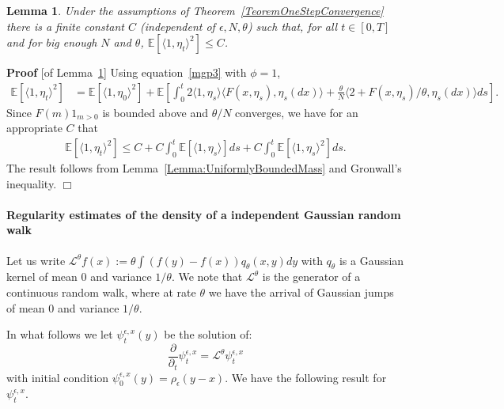 \documentclass[12pt]{article}
\newenvironment {proof}{{\noindent\bf Proof }}{\hfill $\Box$ \medskip}
\newtheorem{lemma}[theorem]{Lemma}
\newcommand{\IE}{\mathbb E}
\begin{document}
\begin{lemma}
        \label{lem:SecondMomentMass}
    Under the assumptions of Theorem~\ref{TeoremOneStepConvergence}
    there is a finite constant $C$ (independent of $\epsilon, N, \theta$) such that,
    for all $t \in [0,T]$ and for big enough $N$ and $\theta$,
    $\IE[ \langle 1, \eta_t \rangle^2] \leq C$.
\end{lemma} 

\begin{proof}[of Lemma~\ref{lem:SecondMomentMass}]
    Using equation~\eqref{mgp3} with $\phi = 1$,
    \begin{align*}
        \IE[\langle 1, \eta_t \rangle^2]
        &=
        \IE[\langle 1, \eta_0 \rangle^2]
        +
        \IE\left[
        \int_0^t
            2 \langle 1, \eta_s \rangle
            \langle F(x, \eta_s), \eta_s(dx) \rangle
            +
            \frac{\theta}{N} \langle 2 + F(x, \eta_s)/\theta, \eta_s(dx) \rangle
        ds
        \right] .
    \end{align*}
    Since $F(m)1_{m > 0}$ is bounded above and $\theta/N$ converges,
    we have for an appropriate $C$ that
    \begin{align*}
        \IE[\langle 1, \eta_t \rangle^2]
        \le
        C + C \int_0^t \IE[\langle 1, \eta_s \rangle] ds
        + C \int_0^t \IE[\langle 1, \eta_s \rangle^2] ds .
    \end{align*}
    The result follows from Lemma~\ref{Lemma:UniformlyBoundedMass} and Gronwall's inequality.
\end{proof}


\paragraph{Regularity estimates of the density of a independent Gaussian random walk}
Let us write $\mathcal{L}^\theta f(x) := \theta \int (f(y)-f(x))q_\theta(x,y) dy$ with $q_\theta$ is a Gaussian kernel of mean $0$ and variance $1/\theta$. We note that $\mathcal{L}^\theta$ is the generator of a continuous random walk, where at rate $\theta$ we have the arrival of Gaussian jumps of mean $0$ and variance $1/\theta$.

In what follows we let $\psi_t^{\epsilon, x}(y)$ be the solution of:
\begin{equation}
    \frac{\partial}{ \partial_t} \psi_t^{\epsilon,x}
    =
    \mathcal{L}^\theta \psi_t^{\epsilon, x}
    \label{AlmostHeatEquation}
\end{equation}
with initial condition $\psi_0^{\epsilon,x}(y) = \rho_\epsilon(y-x)$.
We have the following result for $\psi_t^{\epsilon,x}$.
\end{document}
